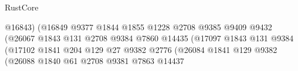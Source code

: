\begin{lexlean}{RustCore}
\begin{coremodule}
                                                          @16843)
                                                        (@16849
                                                          @9377
                                                          @1844
                                                          @1855
                                                          @1228
                                                          @2708
                                                          @9385
                                                          @9409
                                                          @9432
                                                          (@26067
                                                            @1843
                                                            @131
                                                            @2708
                                                            @9384
                                                            @7860
                                                            @14435
                                                            (@17097
                                                              @1843
                                                              @131
                                                              @9384
                                                              (@17102
                                                                @1841
                                                                @204
                                                                @129
                                                                @27
                                                                @9382
                                                                @2776
                                                                (@26084
                                                                  @1841
                                                                  @129
                                                                  @9382
                                                                  (@26088
                                                                    @1840
                                                                    @61
                                                                    @2708
                                                                    @9381
                                                                    @7863
                                                                    @14437

\end{coremodule}
\end{lexlean}
